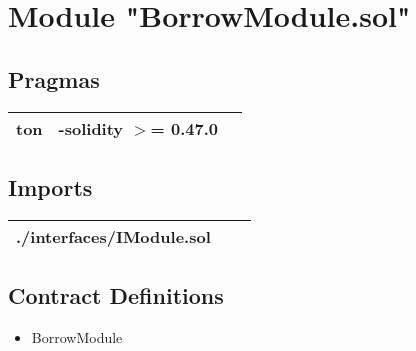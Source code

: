 
\section{Module "BorrowModule.sol"}


\subsection{Pragmas}


\noindent\begin{tabular}{|l|l|p{5cm}|}\hline
ton & -solidity $>$= 0.47.0 &\\\hline
\end{tabular}


\subsection{Imports}


\noindent\begin{tabular}{|l|l|p{5cm}|}\hline
./interfaces/IModule.sol &\\\hline
\end{tabular}


\subsection{Contract Definitions}

\begin{itemize}
\item BorrowModule
\end{itemize}
